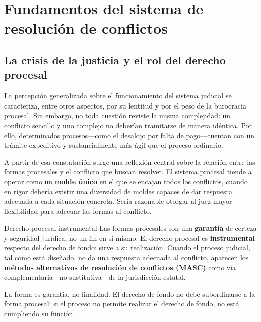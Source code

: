 \documentclass[12pt,oneside]{book}
\begin{document}
\frontmatter
\tableofcontents
\cleardoublepage

\mainmatter

\chapter{Fundamentos del sistema de resoluci\'on de conflictos}

\section{La crisis de la justicia y el rol del derecho procesal}

La percepción generalizada sobre el funcionamiento del sistema judicial
se caracteriza, entre otros aspectos, por su lentitud y por el peso
de la burocracia procesal. Sin embargo, no toda cuestión reviste la
misma complejidad: un conflicto sencillo y uno complejo no deberían
tramitarse de manera idéntica. Por ello, determinados procesos---como
el desalojo por falta de pago---cuentan con un trámite expeditivo y
sustancialmente más ágil que el proceso ordinario.

A partir de esa constatación surge una reflexión central sobre la
relación entre las formas procesales y el conflicto que buscan resolver.
El sistema procesal tiende a operar como un \textbf{molde único} en el
que se encajan todos los conflictos, cuando en rigor debería existir una
diversidad de moldes capaces de dar respuesta adecuada a cada situación
concreta. Sería razonable otorgar al juez mayor flexibilidad para
adecuar las formas al conflicto.

\begin{definition}{Derecho procesal instrumental}
Las formas procesales son una \textbf{garantía} de certeza y seguridad
jurídica, no un fin en sí mismo. El derecho procesal es \textbf{instrumental}
respecto del derecho de fondo: sirve a su realización. Cuando el proceso
judicial, tal como está diseñado, no da una respuesta adecuada al
conflicto, aparecen los \textbf{métodos alternativos de resolución de
conflictos (MASC)} como vía complementaria---no sustitutiva---de la
jurisdicción estatal.
\end{definition}

\begin{important}
La forma es garantía, no finalidad. El derecho de fondo no debe
subordinarse a la forma procesal: si el proceso no permite realizar el
derecho de fondo, no está cumpliendo su función.
\end{important}
\end{document}
